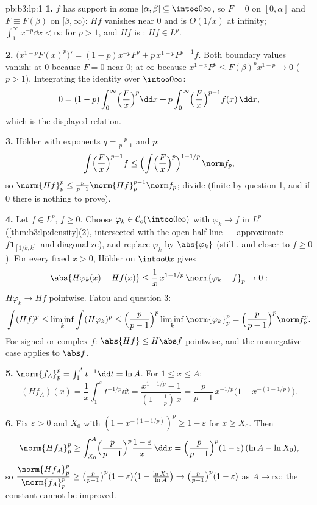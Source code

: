 \begin{solution}{pb:b3:lp:1}
\textbf{1.} $f$ has support in some $[\alpha, \beta]
\subseteq \intoo0\infty$, so $F = 0$ on $[0, \alpha]$ and $F
\equiv F(\beta)$ on $[\beta, \infty)$: $Hf$ vanishes near $0$
and is $O(1/x)$ at infinity; $\int_1^\infty x^{-p}\dd x <
\infty$ for $p > 1$, and $Hf$ is : $Hf \in L^p$.

\textbf{2.} $\bigl(x^{1-p}F(x)^p\bigr)' = (1-p)x^{-p}F^p +
p\,x^{1-p}F^{p-1}f$. Both boundary values vanish: at $0$
because $F = 0$ near $0$; at $\infty$ because $x^{1-p}F^p \leq
F(\beta)^p x^{1-p} \to 0$ ($p > 1$). Integrating the identity
over $\intoo0\infty$:
\[
0 = (1 - p)\int_0^\infty\Bigl(\frac Fx\Bigr)^p\dd x
+ p\int_0^\infty\Bigl(\frac Fx\Bigr)^{p-1}f(x)\,\dd x,
\]
which is the displayed relation.

\textbf{3.} H\"older with exponents $q = \frac p{p-1}$ and $p$:
\[
\int\Bigl(\frac Fx\Bigr)^{p-1}f
\leq \Bigl(\int\Bigl(\frac
Fx\Bigr)^{p}\Bigr)^{1 - 1/p}\,\norm f_p ,
\]
so $\norm{Hf}_p^p \leq \frac p{p-1}\norm{Hf}_p^{p-1}\norm
f_p$; divide (finite by question 1, and if $0$ there is
nothing to prove).

\textbf{4.} Let $f \in L^p$, $f \geq 0$. Choose $\varphi_k \in
\mathcal C_c(\intoo0\infty)$ with $\varphi_k \to f$ in $L^p$
(\cref{thm:b3:lp:density}(2), intersected with the open
half-line --- approximate $f\mathbf 1_{[1/k, k]}$ and
diagonalize), and replace $\varphi_k$ by $\abs{\varphi_k}$
(still , and closer to $f \geq 0$). For every fixed
$x > 0$, H\"older on $\intoo0x$ gives
\[
\abs{H\varphi_k(x) - Hf(x)} \leq
\frac1x\,x^{1 - 1/p}\,\norm{\varphi_k - f}_p \to 0 :
\]
$H\varphi_k \to Hf$ pointwise. Fatou and question 3:
\[
\int (Hf)^p \leq \liminf_k\int(H\varphi_k)^p
\leq \Bigl(\frac p{p-1}\Bigr)^p\liminf_k\norm{\varphi_k}_p^p
= \Bigl(\frac p{p-1}\Bigr)^p\norm f_p^p .
\]
For signed or complex $f$: $\abs{Hf} \leq H\abs f$ pointwise,
and the nonnegative case applies to $\abs f$.

\textbf{5.} $\norm{f_A}_p^p = \int_1^A t^{-1}\dd t = \ln A$.
For $1 \leq x \leq A$:
\[
(Hf_A)(x) = \frac1x\int_1^x t^{-1/p}\dd t
= \frac{x^{1 - 1/p} - 1}{(1 - \tfrac1p)\,x}
= \frac p{p-1}\,x^{-1/p}\bigl(1 - x^{-(1 - 1/p)}\bigr).
\]

\textbf{6.} Fix $\varepsilon > 0$ and $X_0$ with $(1 -
x^{-(1-1/p)})^p \geq 1 - \varepsilon$ for $x \geq X_0$. Then
\[
\norm{Hf_A}_p^p \geq \int_{X_0}^A\Bigl(\frac
p{p-1}\Bigr)^p\frac{1 - \varepsilon}{x}\,\dd x
= \Bigl(\frac p{p-1}\Bigr)^p(1 - \varepsilon)\,(\ln A - \ln
X_0),
\]
so $\dfrac{\norm{Hf_A}_p^p}{\norm{f_A}_p^p} \geq \bigl(\frac
p{p-1}\bigr)^p(1 - \varepsilon)\bigl(1 - \frac{\ln X_0}{\ln
A}\bigr) \to \bigl(\frac p{p-1}\bigr)^p(1 - \varepsilon)$ as
$A \to \infty$: the constant cannot be improved.


\end{solution}
